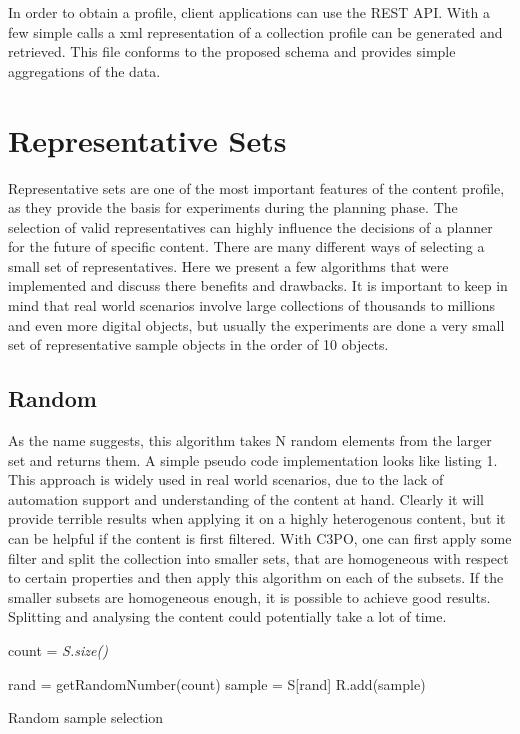 In order to obtain a profile, client applications can use the REST API. With a few simple calls a xml representation of a collection profile can be generated and retrieved. This file conforms to the proposed schema and provides simple aggregations of the data.
 
\section{Representative Sets}
Representative sets are one of the most important features of the content profile, as they provide the basis for experiments during the planning phase. The selection of valid representatives can highly influence the decisions of a planner for the future of specific content. There are many different ways of selecting a small set of representatives.
Here we present a few algorithms that were implemented and discuss there benefits and drawbacks. It is important to keep in mind that real world scenarios involve large collections of thousands to millions and even more digital objects, but usually the experiments are done a very small set of representative sample objects in the order of 10 objects. 

\subsection{Random}
As the  name suggests, this algorithm takes N random elements from the larger set and returns them. A simple pseudo code implementation looks like listing 1. This approach is widely used in real world scenarios, due to the lack of automation support and understanding of the content at hand. Clearly it will provide terrible results when applying it on a highly heterogenous content, but it can be helpful if the content is first filtered. With C3PO, one can first apply some filter and split the collection into smaller sets, that are homogeneous with respect to certain properties and then apply this algorithm on each of the subsets. If the smaller subsets are homogeneous enough, it is possible to achieve good results. Splitting and analysing the content could potentially take a lot of time.\newline

\begin{algorithm}[H]
\SetAlgoLined
{}

 \BlankLine

count = \textit{S.size()}\; 
 
  {
  rand = getRandomNumber(count)\;
  sample = S[rand]\;
  R.add(sample)\; 
 }
 
 \caption{Random sample selection}
\end{algorithm}

